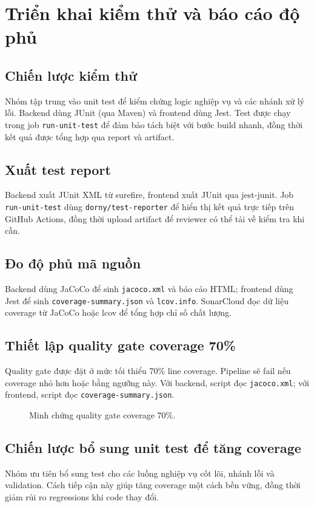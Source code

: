 \section{Triển khai kiểm thử và báo cáo độ phủ}

\subsection{Chiến lược kiểm thử}
Nhóm tập trung vào unit test để kiểm chứng logic nghiệp vụ và các nhánh xử lý lỗi. Backend dùng JUnit (qua Maven) và frontend dùng Jest. Test được chạy trong job \texttt{run-unit-test} để đảm bảo tách biệt với bước build nhanh, đồng thời kết quả được tổng hợp qua report và artifact.

\subsection{Xuất test report}
Backend xuất JUnit XML từ surefire, frontend xuất JUnit qua jest-junit. Job \texttt{run-unit-test} dùng \texttt{dorny/test-reporter} để hiển thị kết quả trực tiếp trên GitHub Actions, đồng thời upload artifact để reviewer có thể tải về kiểm tra khi cần.

\subsection{Đo độ phủ mã nguồn}
Backend dùng JaCoCo để sinh \texttt{jacoco.xml} và báo cáo HTML; frontend dùng Jest để sinh \texttt{coverage-summary.json} và \texttt{lcov.info}. SonarCloud đọc dữ liệu coverage từ JaCoCo hoặc lcov để tổng hợp chỉ số chất lượng.

\subsection{Thiết lập quality gate coverage 70\%}
Quality gate được đặt ở mức tối thiểu 70\% line coverage. Pipeline sẽ fail nếu coverage nhỏ hơn hoặc bằng ngưỡng này. Với backend, script đọc \texttt{jacoco.xml}; với frontend, script đọc \texttt{coverage-summary.json}. 

\begin{figure}[H]
	\centering
	\caption{Minh chứng quality gate coverage 70\%.}
\end{figure}

\subsection{Chiến lược bổ sung unit test để tăng coverage}
Nhóm ưu tiên bổ sung test cho các luồng nghiệp vụ cốt lõi, nhánh lỗi và validation. Cách tiếp cận này giúp tăng coverage một cách bền vững, đồng thời giảm rủi ro regressions khi code thay đổi.

